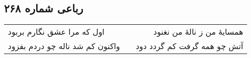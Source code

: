\begin{center}
\section*{رباعی شماره ۲۶۸}
\label{sec:sh268}
\begin{longtable}{l p{0.5cm} r}
اول که مرا عشق نگارم بربود
&&
همسایهٔ من ز نالهٔ من نغنود
\\
واکنون کم شد ناله چو دردم بفزود
&&
آتش چو همه گرفت کم گردد دود
\\
\end{longtable}
\end{center}
